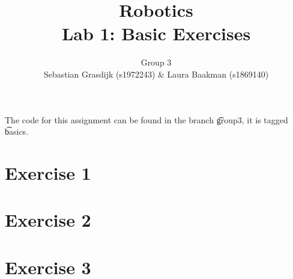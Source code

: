 \documentclass[a4paper]{article}
\title{Robotics\\ Lab 1: Basic Exercises}
\author{Group 3\\Sebastian Grasdijk (s1972243) \& Laura Baakman (s1869140)}
\begin{document}
\maketitle

\noindent The code for this assignment can be found in the branch \t{group3}, it is tagged \t{basics}.

\section*{Exercise 1}


\section*{Exercise 2}


\section*{Exercise 3}


\printbibliography

\clearpage
\appendix

\end{document}

